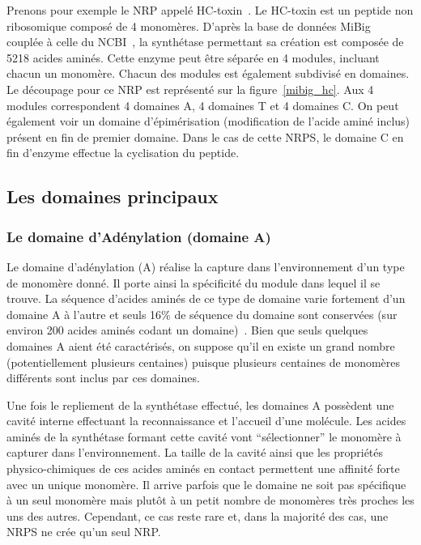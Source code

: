 Prenons pour exemple le NRP appelé HC-toxin~\cite{_mibig:_????}.
Le HC-toxin est un peptide non ribosomique composé de 4 monomères.
D'après la base de données MiBig~\cite{medema_minimum_2015} couplée à celle du NCBI~\cite{ncbi_resource_coordinators_database_2013}, la synthétase permettant sa création est composée de 5218 acides aminés.
Cette enzyme peut être séparée en 4 modules, incluant chacun un monomère.
Chacun des modules est également subdivisé en domaines.
Le découpage pour ce NRP est représenté sur la figure~\ref{mibig_hc}.
Aux 4 modules correspondent 4 domaines A, 4 domaines T et 4 domaines C.
On peut également voir un domaine d'épimérisation (modification de l'acide aminé inclus) présent en fin de premier domaine.
Dans le cas de cette NRPS, le domaine C en fin d'enzyme effectue la cyclisation du peptide.

\subsection{Les domaines principaux}

\subsubsection{Le domaine d'Adénylation (domaine A)}

Le domaine d'adénylation (A) réalise la capture dans l'environnement d'un type de monomère donné.
Il porte ainsi la spécificité du module dans lequel il se trouve.
La séquence d'acides aminés de ce type de domaine varie fortement d'un domaine A à l'autre et seuls 16\% de séquence du domaine sont conservées (sur environ 200 acides aminés codant un domaine)~\cite{stachelhaus_specificity-conferring_1999}.
Bien que seuls quelques domaines A aient été caractérisés, on suppose qu'il en existe un grand nombre (potentiellement plusieurs centaines) puisque
plusieurs centaines de monomères différents sont inclus par ces domaines.

Une fois le repliement de la synthétase effectué, les domaines A possèdent une cavité interne effectuant la reconnaissance et l'accueil d'une molécule.
Les acides aminés de la synthétase formant cette cavité vont ``sélectionner'' le monomère à capturer dans l'environnement.
La taille de la cavité ainsi que les propriétés physico-chimiques de ces acides aminés en contact permettent une affinité forte avec un unique monomère.
Il arrive parfois que le domaine ne soit pas spécifique à un seul monomère mais plutôt à un petit nombre de monomères très proches les uns des autres.
Cependant, ce cas reste rare et, dans la majorité des cas, une NRPS ne crée qu'un seul NRP.

